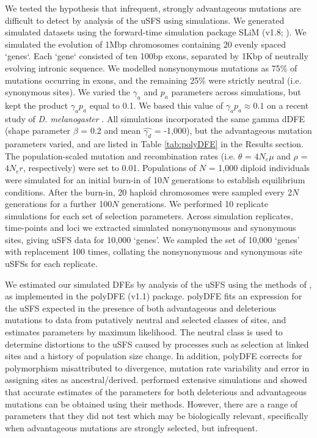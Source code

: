 	We tested the hypothesis that infrequent, strongly advantageous mutations are difficult to detect by analysis of the uSFS using simulations. We generated simulated datasets using the forward-time simulation package SLiM (v1.8; \citealt{RN148}). We simulated the evolution of 1Mbp chromosomes containing 20 evenly spaced  `genes`. Each `gene` consisted of ten 100bp exons, separated by 1Kbp of neutrally evolving intronic sequence. We modelled nonsynonymous mutations as 75\% of mutations occurring in exons, and the remaining 25\% were strictly neutral (i.e. synonymous sites). We varied the $\gamma_a$ and $p_a$ parameters across simulations, but kept the product $\gamma_a p_a$ equal to 0.1. We based this value of $\gamma_a p_a \approx 0.1$ on a recent study of \textit{D. melanogaster} \citep{RN321}. All simulations incorporated the same gamma dDFE (shape parameter $\beta$ = 0.2 and mean $\hat{\gamma_d}$ = -1,000), but the advantageous mutation parameters varied, and are listed in Table \ref{tab:polyDFE} in the Results section. The population-scaled mutation and recombination rates (i.e. $\theta$ = \emph{$4N_{e}\mu$} and $\rho$ = \emph{$4N_{e}r$}, respectively) were set to 0.01. Populations of $N$ = 1,000 diploid individuals were simulated for an initial burn-in of 10$N$ generations to establish equilibrium conditions. After the burn-in, 20 haploid chromosomes were sampled every 2$N$ generations for a further 100$N$ generations. We performed 10 replicate simulations for each set of selection parameters. Across simulation replicates, time-points and loci we extracted simulated nonsynonymous and synonymous sites, giving uSFS data for 10,000 `genes'. We sampled the set of 10,000 `genes' with replacement 100 times, collating the nonsynonymous and synonymous site uSFSs for each replicate.
	
	We estimated our simulated DFEs by analysis of the uSFS using the methods of \cite{RN354}, as implemented in the polyDFE (v1.1) package. polyDFE fits an expression for the uSFS expected in the presence of both advantageous and deleterious mutations to data from putatively neutral and selected classes of sites, and estimates parameters by maximum likelihood. The neutral class is used to determine distortions to the uSFS caused by processes such as selection at linked sites and a history of population size change. In addition, polyDFE corrects for polymorphism misattributed to divergence, mutation rate variability and error in assigning sites as ancestral/derived. \cite{RN354} performed extensive simulations and showed that accurate estimates of the parameters for both deleterious and advantageous mutations can be obtained using their methods. However, there are a range of parameters that they did not test which may be biologically relevant, specifically when advantageous mutations are strongly selected, but infrequent.

